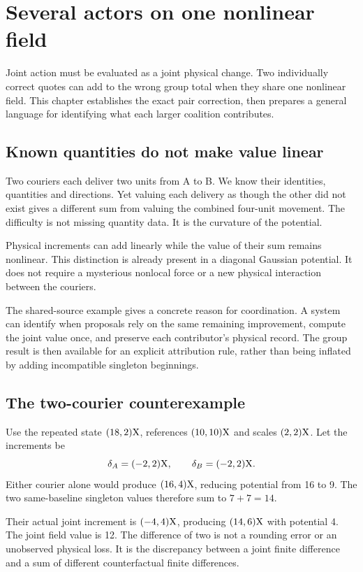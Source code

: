 \chapter{Several actors on one nonlinear field}\label{ch:groups}

Joint action must be evaluated as a joint physical change. Two individually correct quotes can add to the wrong group total when they share one nonlinear field. This chapter establishes the exact pair correction, then prepares a general language for identifying what each larger coalition contributes.


\section{Known quantities do not make value linear}
Two couriers each deliver two units from A to B. We know their identities, quantities and directions. Yet valuing each delivery as though the other did not exist gives a different sum from valuing the combined four-unit movement. The difficulty is not missing quantity data. It is the curvature of the potential.

Physical increments can add linearly while the value of their sum remains nonlinear. This distinction is already present in a diagonal Gaussian potential. It does not require a mysterious nonlocal force or a new physical interaction between the couriers.

The shared-source example gives a concrete reason for coordination. A system can identify when proposals rely on the same remaining improvement, compute the joint value once, and preserve each contributor's physical record. The group result is then available for an explicit attribution rule, rather than being inflated by adding incompatible singleton beginnings.

\section{The two-courier counterexample}
Use the repeated state $(18,2)\mathrm{X}$, references $(10,10)\mathrm{X}$ and scales $(2,2)\mathrm{X}$. Let the increments be
\[
 \delta_A=(-2,2)\mathrm{X},\qquad \delta_B=(-2,2)\mathrm{X}.
\]
Either courier alone would produce $(16,4)\mathrm{X}$, reducing potential from 16 to 9. The two same-baseline singleton values therefore sum to $7+7=14$.

Their actual joint increment is $(-4,4)\mathrm{X}$, producing $(14,6)\mathrm{X}$ with potential 4. The joint field value is 12. The difference of two is not a rounding error or an unobserved physical loss. It is the discrepancy between a joint finite difference and a sum of different counterfactual finite differences.

